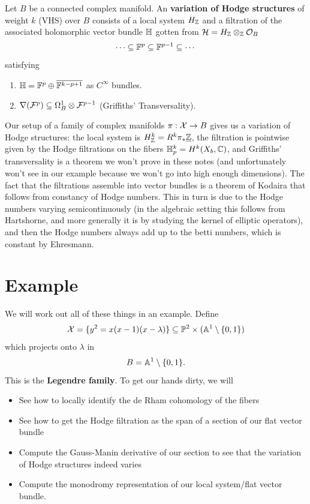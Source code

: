\documentclass[12pt]{article}
\begin{document}
\begin{defn}
    Let $B$ be a connected complex manifold. An \textbf{variation of Hodge structures} of weight $k$ (VHS) over $B$ consists of a local system $H_{\mathbb{Z}}$ and a filtration of the associated holomorphic vector bundle $\mathbb{H}$ gotten from $\mathcal{H} = H_{\mathbb{Z}} \otimes_{\mathbb{Z}} \mathcal{O}_B$
    \[\cdots \subseteq \mathbb{F}^p \subseteq \mathbb{F}^{p-1} \subseteq \cdots\]
    satisfying
    \begin{enumerate}
        \item $\mathbb{H} = \mathbb{F}^p \oplus \overline{\mathbb{F}^{k-p+1}}$ as $C^\infty$ bundles.
        \item $\nabla(\mathcal{F}^p) \subseteq \Omega_B^1 \otimes \mathcal{F}^{p-1}$ (Griffiths' Transversality).
    \end{enumerate}
\end{defn}

Our setup of a family of complex manifolds $\pi: \mathcal{X} \to B$ gives us a variation of Hodge structures: the local system is $H^k_{\mathbb{Z}} = R^k\pi_* \underline{\mathbb{Z}}$, the filtration is pointwise given by the Hodge filtrations on the fibers $\mathbb{H}^k_p = H^k(X_b, \mathbb{C})$, and Griffiths' transversality is a theorem we won't prove in these notes (and unfortunately won't see in our example because we won't go into high enough dimensions). The fact that the filtrations assemble into vector bundles is a theorem of Kodaira that follows from constancy of Hodge numbers. This in turn is due to the Hodge numbers varying semicontinuously (in the algebraic setting this follows from Hartshorne, and more generally it is by studying the kernel of elliptic operators), and then the Hodge numbers always add up to the betti numbers, which is constant by Ehresmann.

\section{Example}

We will work out all of these things in an example. Define
\[\mathcal{X} = \{y^2=x(x-1)(x-\lambda) \} \subseteq \mathbb{P}^2\times (\mathbb{A}^1\setminus\{0,1\})\]
which projects onto $\lambda$ in
\[B = \mathbb{A}^1\setminus\{0,1\}.\]
This is the \textbf{Legendre family}. To get our hands dirty, we will
\begin{itemize}
    \item See how to locally identify the de Rham cohomology of the fibers
    \item See how to get the Hodge filtration as the span of a section of our flat vector bundle
    \item Compute the Gauss-Manin derivative of our section to see that the variation of Hodge structures indeed varies
    \item Compute the monodromy representation of our local system/flat vector bundle.
\end{itemize}
\end{document}
